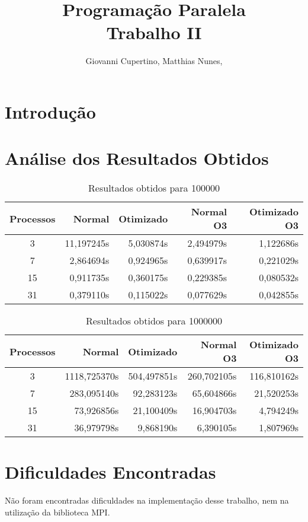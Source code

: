 \documentclass[11pt]{IEEEtran}
\title{Programação Paralela\\ Trabalho II}
\author{Giovanni Cupertino, Matthias Nunes, \IEEEmembership{Usuário pp12820}}
\begin{document}
\maketitle

\section{Introdução}



\section{Análise dos Resultados Obtidos}

	\begin{table}[H]
		\centering
			\begin{tabular}{c|r|r|r|r}
				Processos & Normal & Otimizado & Normal O3 & Otimizado O3 \\
				\hline
				3  & 11,197245s & 5,030874s & 2,494979s & 1,122686s \\
				\hline
				7  &  2,864694s & 0,924965s & 0,639917s & 0,221029s \\
				\hline
				15 &  0,911735s & 0,360175s & 0,229385s & 0,080532s \\
				\hline
				31 &  0,379110s & 0,115022s & 0,077629s & 0,042855s \\
			\end{tabular}
		\caption{Resultados obtidos para 100000}
		\label{result_table}
	\end{table}

	\begin{table}[H]
		\centering
			\begin{tabular}{c|r|r|r|r}
				Processos & Normal & Otimizado & Normal O3 & Otimizado O3 \\
				\hline
				3  & 1118,725370s & 504,497851s & 260,702105s & 116,810162s \\
				\hline
				7  &  283,095140s &  92,283123s &  65,604866s & 21,520253s \\
				\hline
				15 &   73,926856s &  21,100409s &  16,904703s & 4,794249s \\
				\hline
				31 &   36,979798s &   9,868190s &   6,390105s & 1,807969s \\
			\end{tabular}
		\caption{Resultados obtidos para 1000000}
		\label{result_table}
	\end{table}


\section{Dificuldades Encontradas}

	Não foram encontradas dificuldades na implementação desse trabalho, nem na
	utilização da biblioteca MPI\@.
\end{document}

